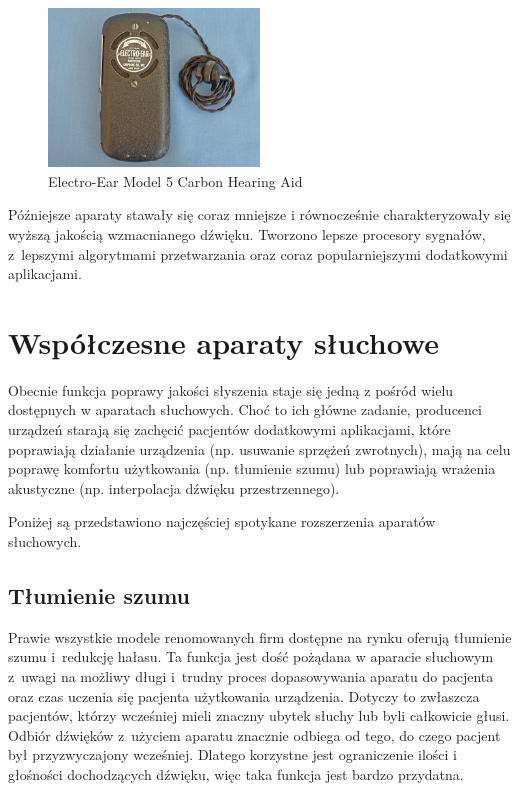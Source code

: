 \documentclass[journal,11pt]{IEEEtran}
\begin{document}
\begin{figure}
    \includegraphics[width=0.5\textwidth]{electroear}
    \caption{Electro-Ear Model 5 Carbon Hearing Aid}
    \label{fig:electroear}
\end{figure}

Późniejsze aparaty stawały się coraz mniejsze i równocześnie charakteryzowały
się wyższą jakością wzmacnianego dźwięku. Tworzono lepsze procesory sygnałów,
z~lepszymi algorytmami przetwarzania oraz coraz popularniejszymi dodatkowymi aplikacjami.

\section{Współczesne aparaty słuchowe}

Obecnie funkcja poprawy jakości słyszenia staje się jedną z pośród wielu
dostępnych w aparatach słuchowych. Choć to ich główne zadanie, producenci
urządzeń starają się zachęcić pacjentów dodatkowymi aplikacjami, które
poprawiają działanie urządzenia (np. usuwanie sprzężeń zwrotnych), mają na celu
poprawę komfortu użytkowania (np. tłumienie szumu) lub poprawiają wrażenia
akustyczne (np. interpolacja dźwięku przestrzennego).

Poniżej są przedstawiono najczęściej spotykane rozszerzenia aparatów słuchowych.

\subsection{Tłumienie szumu}

Prawie wszystkie modele renomowanych firm dostępne na rynku oferują tłumienie
szumu i~redukcję hałasu. Ta funkcja jest dość pożądana w aparacie słuchowym
z~uwagi na możliwy długi i~trudny proces dopasowywania aparatu do pacjenta
oraz czas uczenia się pacjenta użytkowania urządzenia. Dotyczy to zwłaszcza
pacjentów, którzy wcześniej mieli znaczny ubytek słuchy lub byli całkowicie
głusi. Odbiór dźwięków z~użyciem aparatu znacznie odbiega od tego, do czego
pacjent był przyzwyczajony wcześniej. Dlatego korzystne jest ograniczenie
ilości i głośności dochodzących dźwięku, więc taka funkcja jest bardzo
przydatna.
\end{document}
